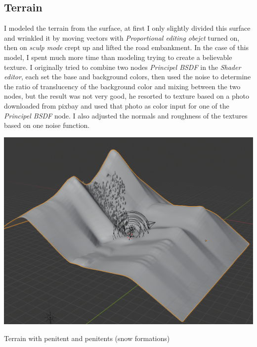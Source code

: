 \documentclass[12pt,a4paper,titlepage,final,tikz,border=4mm]{report}
\begin{document}
\subsection{Terrain}
I modeled the terrain from the surface, at first I only slightly divided this surface and wrinkled it by moving vectors with \textit{Proportional editing obejct} turned on, then on \textit{sculp mode} crept up and lifted the road embankment. In the case of this model, I spent much more time than modeling trying to create a believable texture. I originally tried to combine two nodes \textit{Principel BSDF} in the \textit{Shader editor}, each set the base and background colors, then used the noise to determine the ratio of translucency of the background color and mixing between the two nodes, but the result was not very good, he resorted to texture based on a photo downloaded from pixbay and used that photo as color input for one of the \textit{Principel BSDF} node. I also adjusted the normals and roughness of the textures based on one noise function.
\begin {center}
\includegraphics [height = 10cm] {terrain.png}
\caption {Terrain with penitent and penitents (snow formations)}
\end {center}
\end{document}

